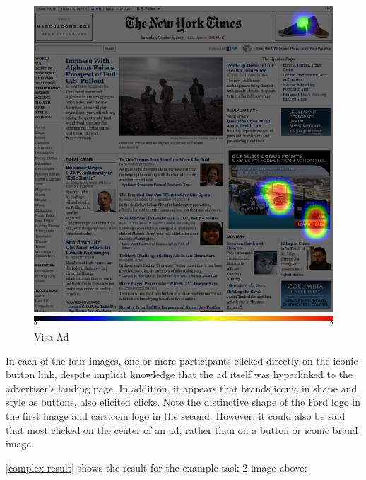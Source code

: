 \begin{figure}
\centerline{
\includegraphics[scale=.3]{chapter6.tex/visa-hotspot}
}
\caption{Visa Ad}
\label{prepilot-visa}
\end{figure}

In each of the four images, one or more participants clicked directly on the iconic button link, despite implicit knowledge that the ad itself was hyperlinked to the advertiser's landing page. In addition, it appears that brands iconic in shape and style as buttons, also elicited clicks. Note the distinctive shape of the Ford logo in the first image and cars.com logo in the second. However, it could also be said that most clicked on the center of an ad, rather than on a button or iconic brand image.

 \autoref{complex-result}  shows the result for the example task 2 image above:

